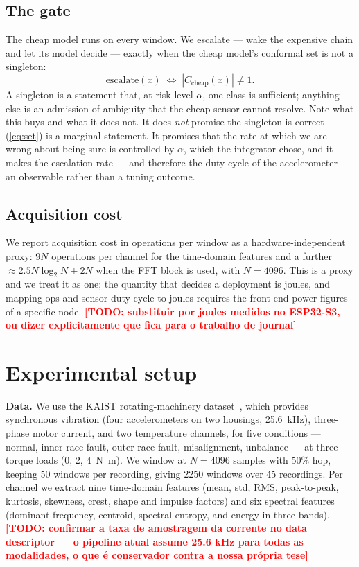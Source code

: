\documentclass{article}
\newcommand{\TODO}[1]{\textcolor{red}{\textbf{[TODO: #1]}}}
\begin{document}
\subsection{The gate}
The cheap model runs on every window. We escalate --- wake the expensive
chain and let its model decide --- exactly when the cheap model's
conformal set is not a singleton:
\begin{equation}
\text{escalate}(x) \;\Longleftrightarrow\; |C_{\mathrm{cheap}}(x)| \neq 1 .
\label{eq:gate}
\end{equation}
A singleton is a statement that, at risk level $\alpha$, one class is
sufficient; anything else is an admission of ambiguity that the cheap
sensor cannot resolve. Note what this buys and what it does not. It does
\emph{not} promise the singleton is correct --- (\ref{eq:set}) is a
marginal statement. It promises that the rate at which we are wrong about
being sure is controlled by $\alpha$, which the integrator chose, and it
makes the escalation rate --- and therefore the duty cycle of the
accelerometer --- an observable rather than a tuning outcome.

\subsection{Acquisition cost}
We report acquisition cost in operations per window as a
hardware-independent proxy: $9N$ operations per channel for the
time-domain features and a further $\approx 2.5 N \log_2 N + 2N$ when the
FFT block is used, with $N = 4096$. This is a proxy and we treat it as
one; the quantity that decides a deployment is joules, and mapping ops and
sensor duty cycle to joules requires the front-end power figures of a
specific node. \TODO{substituir por joules medidos no ESP32-S3, ou dizer
explicitamente que fica para o trabalho de journal}

\section{Experimental setup}

\textbf{Data.} We use the KAIST rotating-machinery
dataset~\cite{kaist}, which provides synchronous vibration (four
accelerometers on two housings, \SI{25.6}{\kilo\hertz}), three-phase motor
current, and two temperature channels, for five conditions --- normal,
inner-race fault, outer-race fault, misalignment, unbalance --- at three
torque loads (0, 2, \SI{4}{\newton\meter}). We window at $N=4096$ samples
with 50\% hop, keeping 50 windows per recording, giving 2250 windows over
45 recordings. Per channel we extract nine time-domain features (mean,
std, RMS, peak-to-peak, kurtosis, skewness, crest, shape and impulse
factors) and six spectral features (dominant frequency, centroid, spectral
entropy, and energy in three bands).
\TODO{confirmar a taxa de amostragem da corrente no data descriptor ---
o pipeline atual assume 25.6 kHz para todas as modalidades, o que é
conservador contra a nossa própria tese}
\end{document}
